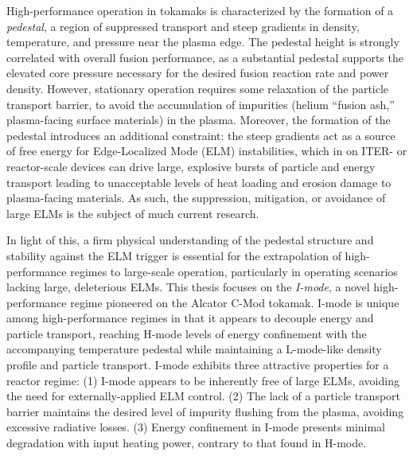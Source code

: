 
High-performance operation in tokamaks is characterized by the formation of a \emph{pedestal}, a region of suppressed transport and steep gradients in density, temperature, and pressure near the plasma edge.  The pedestal height is strongly correlated with overall fusion performance, as a substantial pedestal supports the elevated core pressure necessary for the desired fusion reaction rate and power density.  However, stationary operation requires some relaxation of the particle transport barrier, to avoid the accumulation of impurities (\eg helium ``fusion ash,'' plasma-facing surface materials) in the plasma.  Moreover, the formation of the pedestal introduces an additional constraint: the steep gradients act as a source of free energy for Edge-Localized Mode (ELM) instabilities, which in on ITER- or reactor-scale devices can drive large, explosive bursts of particle and energy transport leading to unacceptable levels of heat loading and erosion damage to plasma-facing materials.  As such, the suppression, mitigation, or avoidance of large ELMs is the subject of much current research.
   
In light of this, a firm physical understanding of the pedestal structure and stability against the ELM trigger is essential for the extrapolation of high-performance regimes to large-scale operation, particularly in operating scenarios lacking large, deleterious ELMs.  This thesis focuses on the \emph{I-mode}, a novel high-performance regime pioneered on the Alcator C-Mod tokamak.  I-mode is unique among high-performance regimes in that it appears to decouple energy and particle transport, reaching H-mode levels of energy confinement with the accompanying temperature pedestal while maintaining a L-mode-like density profile and particle transport.  I-mode exhibits three attractive properties for a reactor regime: (1) I-mode appears to be inherently free of large ELMs, avoiding the need for externally-applied ELM control.  (2) The lack of a particle transport barrier maintains the desired level of impurity flushing from the plasma, avoiding excessive radiative losses.  (3) Energy confinement in I-mode presents minimal degradation with input heating power, contrary to that found in H-mode.
   
